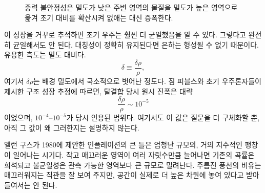 \begin{figure}[htbp]
\centering
\begin{coursefitfigure}
\end{coursefitfigure}
\caption{중력 불안정성은 밀도가 낮은 주변 영역의 물질을 밀도가 높은 영역으로 옮겨 초기 대비를 확산시켜 없애는 대신 증폭한다.}
\label{fig:c08-gravity-growth}
\end{figure}

이 성장을 거꾸로 추적하면 초기 우주는 훨씬 더 균일했음을 알 수 있다. 그렇다고 완전히 균일해서도 안 된다. 대칭성이 정확히 유지된다면 은하는 형성될 수 없기 때문이다. 유용한 측도는 밀도 대비다.
\begin{equation}
\delta\equiv\frac{\delta\rho}{\rho},
\end{equation}
여기서 \(\delta\rho\)는 배경 밀도에서 국소적으로 벗어난 정도다. 짐 피블스와 초기 우주론자들이 제시한 구조 성장 추정에 따르면, 탈결합 당시 원시 진폭은 대략
\begin{equation}
\boxed{\frac{\delta\rho}{\rho}\sim10^{-5}}
\end{equation}
이었으며, \(10^{-4}\)--\(10^{-5}\)가 당시 인용된 범위다. 여기서도 이 값은 질문을 더 구체화할 뿐, 아직 그 값이 왜 그러한지는 설명하지 않는다.

앨런 구스가 1980에 제안한 인플레이션의 큰 틀은 엄청난 규모의, 거의 지수적인 팽창이 일어나는 시기다. 작고 매끄러운 영역이 여러 자릿수만큼 늘어나면 기존의 곡률은 희석되고 불균일성은 관측 가능한 영역보다 큰 규모로 밀려난다. 주름진 풍선의 비유는 매끄러워지는 직관을 잘 보여 주지만, 공간이 실제로 더 높은 차원에 놓여 있다고 받아들여서는 안 된다.

\begin{classroomqa}
\end{classroomqa}

